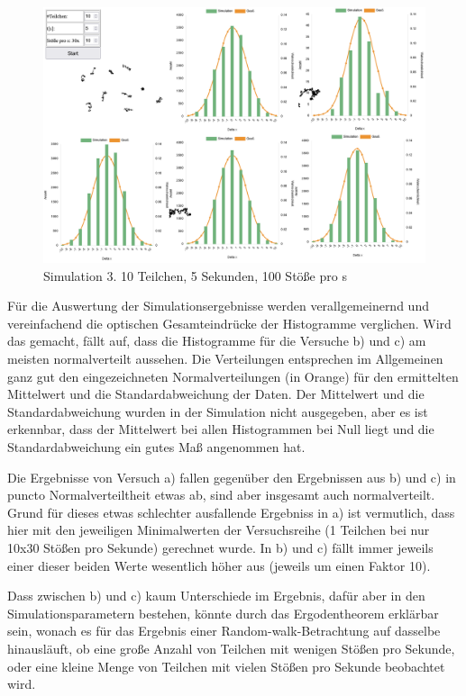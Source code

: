 \documentclass[
  9pt,
]{article}
\begin{document}
\begin{figure}
\centering
\includegraphics[width=\textwidth,height=0.1\textheight]{Daten/c.png}
\caption{Simulation 3. 10 Teilchen, 5 Sekunden, 100 Stöße pro s}
\end{figure}

Für die Auswertung der Simulationsergebnisse werden verallgemeinernd und
vereinfachend die optischen Gesamteindrücke der Histogramme verglichen.
Wird das gemacht, fällt auf, dass die Histogramme für die Versuche b)
und c) am meisten normalverteilt aussehen. Die Verteilungen entsprechen
im Allgemeinen ganz gut den eingezeichneten Normalverteilungen (in
Orange) für den ermittelten Mittelwert und die Standardabweichung der
Daten. Der Mittelwert und die Standardabweichung wurden in der
Simulation nicht ausgegeben, aber es ist erkennbar, dass der Mittelwert
bei allen Histogrammen bei Null liegt und die Standardabweichung ein
gutes Maß angenommen hat.

Die Ergebnisse von Versuch a) fallen gegenüber den Ergebnissen aus b)
und c) in puncto Normalverteiltheit etwas ab, sind aber insgesamt auch
normalverteilt. Grund für dieses etwas schlechter ausfallende Ergebniss
in a) ist vermutlich, dass hier mit den jeweiligen Minimalwerten der
Versuchsreihe (1 Teilchen bei nur 10x30 Stößen pro Sekunde) gerechnet
wurde. In b) und c) fällt immer jeweils einer dieser beiden Werte
wesentlich höher aus (jeweils um einen Faktor 10).

Dass zwischen b) und c) kaum Unterschiede im Ergebnis, dafür aber in den
Simulationsparametern bestehen, könnte durch das Ergodentheorem
erklärbar sein, wonach es für das Ergebnis einer Random-walk-Betrachtung
auf dasselbe hinausläuft, ob eine große Anzahl von Teilchen mit wenigen
Stößen pro Sekunde, oder eine kleine Menge von Teilchen mit vielen
Stößen pro Sekunde beobachtet wird.
\end{document}
